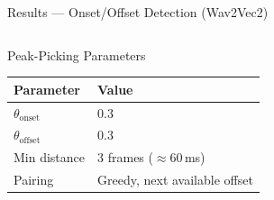 \documentclass[aspectratio=169,9pt]{beamer}
\begin{document}
\begin{frame}{Results --- Onset/Offset Detection (Wav2Vec2)}
\begin{columns}[T]
      \begin{block}{Peak-Picking Parameters}
        \small
        \renewcommand{\arraystretch}{1.2}
        \begin{tabular}{@{}ll@{}}
          \toprule
          Parameter & Value \\
          \midrule
          $\theta_\text{onset}$  & 0.3 \\
          $\theta_\text{offset}$ & 0.3 \\
          Min distance  & 3 frames ($\approx60$\,ms) \\
          Pairing       & Greedy, next available offset \\
          \bottomrule
        \end{tabular}
      \end{block}
  \end{columns}
\end{frame}
\end{document}
